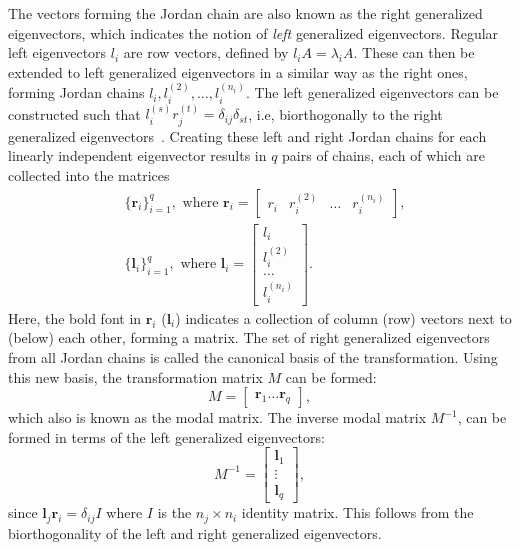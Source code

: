 \documentclass[../main.tex]{subfiles}
\begin{document}
The vectors forming the Jordan chain are also known as the right generalized eigenvectors, which indicates the notion of \textit{left} generalized eigenvectors. Regular left eigenvectors $l_i$ are row vectors, defined by $l_iA = \lambda_iA$. These can then be extended to left generalized eigenvectors in a similar way as the right ones, forming Jordan chains $l_i, l_i^{(2)}, \dots, l_i^{(n_i)}$. The left generalized eigenvectors can be constructed such that $l_i^{(s)}r_j^{(t)}=\delta_{ij}\delta_{st}$, i.e, biorthogonally to the right generalized eigenvectors~\cite{nonHermrev}. Creating these left and right Jordan chains for each linearly independent eigenvector results in $q$ pairs of chains, each of which are collected into the matrices
\begin{equation}
    \begin{aligned}
        &\{\boldsymbol{r}_i\}_{i=1}^q, \text{ where }\boldsymbol{r}_i = \begin{bmatrix}r_i&r_i^{(2)}&\dots &r_i^{(n_i)}\end{bmatrix},\\
        &\{\boldsymbol{l}_i\}_{i=1}^q, \text{ where }\boldsymbol{l}_i = \begin{bmatrix}l_i\\ l_i^{(2)}\\\dots \\ l_i^{(n_i)}\end{bmatrix}.
    \end{aligned}
\end{equation}
Here, the bold font in $\boldsymbol{r}_i$ ($\boldsymbol{l}_i$) indicates a collection of column (row) vectors next to (below) each other, forming a matrix. The set of right generalized eigenvectors from all Jordan chains is called the canonical basis of the transformation. Using this new basis, the transformation matrix $M$ can be formed:
\begin{equation}\label{chofba}
    M = \begin{bmatrix}\boldsymbol{r}_1 \dots \boldsymbol{r}_q\end{bmatrix},
\end{equation}
which also is known as the modal matrix. The inverse modal matrix $M^{-1}$, can be formed in terms of the left generalized eigenvectors: 
\begin{equation}\label{chofbaleft}
    M^{-1} = \begin{bmatrix}\boldsymbol{l}_1\\ \vdots \\ \boldsymbol{l}_q\end{bmatrix},
\end{equation}
since $\boldsymbol{l}_j \boldsymbol{r}_i = \delta_{ij}I$ where $I$ is the $n_j\times n_i$ identity matrix. This follows from the biorthogonality of the left and right generalized eigenvectors.
\end{document}
